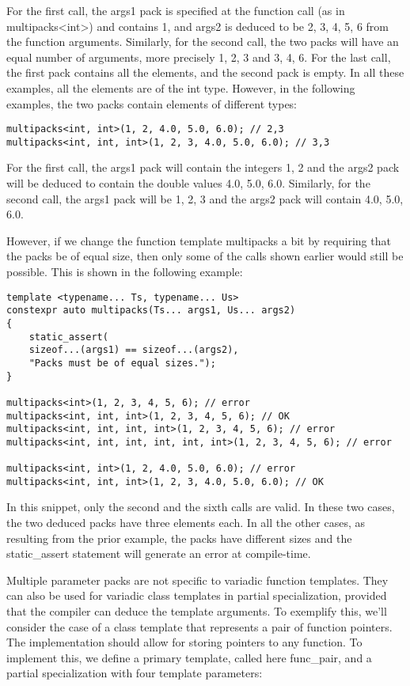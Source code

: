 For the first call, the args1 pack is specified at the function call (as in multipacks<int>) and contains 1, and args2 is deduced to be 2, 3, 4, 5, 6 from the function arguments. Similarly, for the second call, the two packs will have an equal number of arguments, more precisely 1, 2, 3 and 3, 4, 6. For the last call, the first pack contains all the elements, and the second pack is empty. In all these examples, all the elements are of the int type. However, in the following examples, the two packs contain elements of different types:

\begin{lstlisting}[style=styleCXX]
multipacks<int, int>(1, 2, 4.0, 5.0, 6.0); // 2,3
multipacks<int, int, int>(1, 2, 3, 4.0, 5.0, 6.0); // 3,3
\end{lstlisting}

For the first call, the args1 pack will contain the integers 1, 2 and the args2 pack will be deduced to contain the double values 4.0, 5.0, 6.0. Similarly, for the second call, the args1 pack will be 1, 2, 3 and the args2 pack will contain 4.0, 5.0, 6.0.

However, if we change the function template multipacks a bit by requiring that the packs be of equal size, then only some of the calls shown earlier would still be possible. This is shown in the following example:

\begin{lstlisting}[style=styleCXX]
template <typename... Ts, typename... Us>
constexpr auto multipacks(Ts... args1, Us... args2)
{
	static_assert(
	sizeof...(args1) == sizeof...(args2),
	"Packs must be of equal sizes.");
}

multipacks<int>(1, 2, 3, 4, 5, 6); // error
multipacks<int, int, int>(1, 2, 3, 4, 5, 6); // OK
multipacks<int, int, int, int>(1, 2, 3, 4, 5, 6); // error
multipacks<int, int, int, int, int, int>(1, 2, 3, 4, 5, 6); // error

multipacks<int, int>(1, 2, 4.0, 5.0, 6.0); // error
multipacks<int, int, int>(1, 2, 3, 4.0, 5.0, 6.0); // OK
\end{lstlisting}

In this snippet, only the second and the sixth calls are valid. In these two cases, the two deduced packs have three elements each. In all the other cases, as resulting from the prior example, the packs have different sizes and the static\_assert statement will generate an error at compile-time.

Multiple parameter packs are not specific to variadic function templates. They can also be used for variadic class templates in partial specialization, provided that the compiler can deduce the template arguments. To exemplify this, we'll consider the case of a class template that represents a pair of function pointers. The implementation should allow for storing pointers to any function. To implement this, we define a primary template, called here func\_pair, and a partial specialization with four template parameters:


